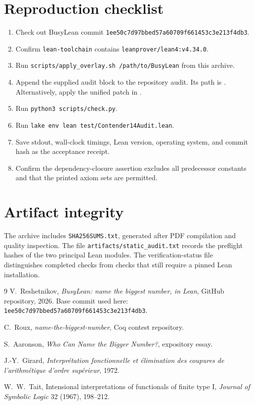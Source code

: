 \documentclass[11pt]{article}
\theoremstyle{definition}
\newcommand{\lean}[1]{\texttt{#1}}
\begin{document}
\section{Reproduction checklist}

\begin{enumerate}
  \item Check out BusyLean commit
  \lean{1ee50c7d97bbed57a60709f661453c3e213f4db3}.
  \item Confirm \lean{lean-toolchain} contains
  \lean{leanprover/lean4:v4.34.0}.
  \item Run \texttt{scripts/apply\_overlay.sh\ /path/to/BusyLean} from this archive.
  \item Append the supplied audit block to the repository audit.  Its path is
        .  Alternatively, apply the unified
        patch in .
  \item Run \texttt{python3\ scripts/check.py}.
  \item Run \texttt{lake\ env\ lean\ test/Contender14Audit.lean}.
  \item Save stdout, wall-clock timings, Lean version, operating system, and
        commit hash as the acceptance receipt.
  \item Confirm the dependency-closure assertion excludes all predecessor
        constants and that the printed axiom sets are permitted.
\end{enumerate}

\section{Artifact integrity}
The archive includes \lean{SHA256SUMS.txt}, generated after PDF compilation and
quality inspection.  The file \lean{artifacts/static\_audit.txt} records the
preflight hashes of the two principal Lean modules.  The verification-status
file distinguishes completed checks from checks that still require a pinned
Lean installation.

\begin{thebibliography}{9}
V.~Reshetnikov,
\emph{BusyLean: name the biggest number, in Lean}, GitHub repository,
2026.  Base commit used here:
\texttt{1ee50c7d97bbed57a60709f661453c3e213f4db3}.

C.~Roux,
\emph{name-the-biggest-number}, Coq contest repository.

S.~Aaronson,
\emph{Who Can Name the Bigger Number?}, expository essay.

J.-Y.~Girard,
\emph{Interpr\'etation fonctionnelle et \'elimination des coupures de
l'arithm\'etique d'ordre sup\'erieur}, 1972.

W.~W.~Tait,
Intensional interpretations of functionals of finite type I,
\emph{Journal of Symbolic Logic} 32 (1967), 198--212.
\end{thebibliography}
\end{document}
